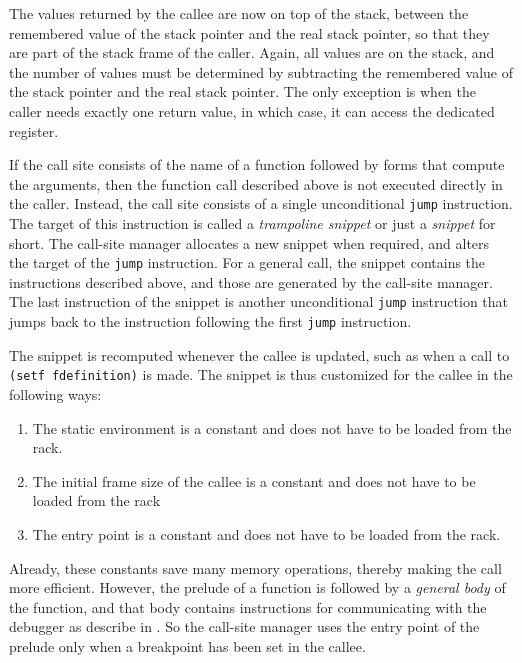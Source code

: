 The values returned by the callee are now on top of the stack, between
the remembered value of the stack pointer and the real stack pointer,
so that they are part of the stack frame of the caller.  Again, all
values are on the stack, and the number of values must be determined
by subtracting the remembered value of the stack pointer and the real
stack pointer.  The only exception is when the caller needs exactly
one return value, in which case, it can access the dedicated register.

If the call site consists of the name of a function followed by forms
that compute the arguments, then the function call described above is
not executed directly in the caller.  Instead, the call site consists
of a single unconditional \texttt{jump} instruction.  The target of
this instruction is called a \emph{trampoline snippet} or just a
\emph{snippet} for short.  The call-site manager allocates a new
snippet when required, and alters the target of the \texttt{jump}
instruction.  For a general call, the snippet contains the
instructions described above, and those are generated by the call-site
manager.  The last instruction of the snippet is another unconditional
\texttt{jump} instruction that jumps back to the instruction following
the first \texttt{jump} instruction.

The snippet is recomputed whenever the callee is updated, such as when
a call to \texttt{(setf fdefinition)} is made.  The snippet is thus
customized for the callee in the following ways:

\begin{enumerate}
\item The static environment is a constant and does not have to be
  loaded from the rack.
\item The initial frame size of the callee is a constant and does not
  have to be loaded from the rack
\item The entry point is a constant and does not have to be loaded
  from the rack.
\end{enumerate}

Already, these constants save many memory operations, thereby making
the call more efficient.  However, the prelude of a function is
followed by a \emph{general body} of the function, and that body
contains instructions for communicating with the debugger as describe
in .  So the call-site manager uses the entry
point of the prelude only when a breakpoint has been set in the
callee.

